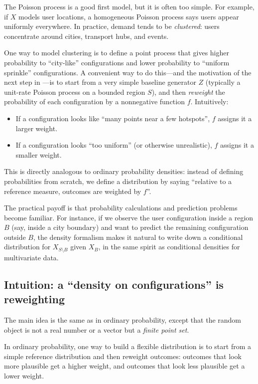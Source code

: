 The Poisson process is a good first model, but it is often too simple. For example, if $X$ models user locations, a
homogeneous Poisson process says users appear uniformly everywhere. In practice, demand tends to be \emph{clustered}:
users concentrate around cities, transport hubs, and events.

One way to model clustering is to define a point process that gives higher probability to ``city-like'' configurations and
lower probability to ``uniform sprinkle'' configurations. A convenient way to do this---and the motivation of the next step
in \cite{coeurjolly2017palm}---is to start from a very simple baseline generator $Z$ (typically a unit-rate Poisson process
on a bounded region $S$), and then \emph{reweight} the probability of each configuration by a nonnegative function $f$.
Intuitively:
\begin{itemize}
    \item If a configuration looks like ``many points near a few hotspots'', $f$ assigns it a larger weight.
    \item If a configuration looks ``too uniform'' (or otherwise unrealistic), $f$ assigns it a smaller weight.
\end{itemize}
This is directly analogous to ordinary probability densities: instead of defining probabilities from scratch, we define a
distribution by saying ``relative to a reference measure, outcomes are weighted by $f$''.

The practical payoff is that probability calculations and prediction problems become familiar. For instance, if we observe
the user configuration inside a region $B$ (say, inside a city boundary) and want to predict the remaining configuration
outside $B$, the density formalism makes it natural to write down a conditional distribution for $X_{S\setminus B}$ given
$X_B$, in the same spirit as conditional densities for multivariate data.

\subsection{Intuition: a ``density on configurations'' is reweighting}
The main idea is the same as in ordinary probability, except that the random object is not a real number or a vector but a
\emph{finite point set}.

In ordinary probability, one way to build a flexible distribution is to start from a simple reference distribution and then
reweight outcomes: outcomes that look more plausible get a higher weight, and outcomes that look less plausible get a
lower weight.

